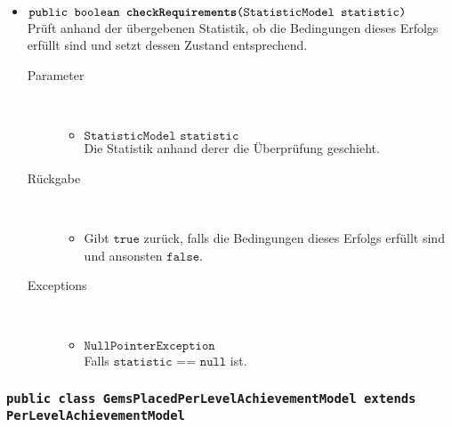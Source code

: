 \begin{description}
\begin{itemize}
		\item $\texttt{public boolean \textbf{checkRequirements}(StatisticModel statistic)}$ \\ Prüft anhand der übergebenen Statistik, ob die Bedingungen dieses Erfolgs erfüllt sind und setzt dessen Zustand entsprechend.
		\begin{description}
		\item[Parameter] \hfill \\
			\vspace{-.8cm}
			\begin{itemize}
				\item $\texttt{StatisticModel statistic}$ \\ Die Statistik anhand derer die Überprüfung geschieht. 
			\end{itemize}
			\item[Rückgabe] \hfill \\
			\vspace{-.8cm}
			\begin{itemize}
				\item Gibt $\texttt{true}$ zurück, falls die Bedingungen dieses Erfolgs erfüllt sind und ansonsten $\texttt{false}$.
			\end{itemize}
			\item[Exceptions] \hfill \\
			\vspace{-.8cm}
			\begin{itemize}
				\item $\texttt{NullPointerException}$ \\ Falls $\texttt{statistic == null}$ ist.
			\end{itemize}
		\end{description}
	\end{itemize}
\end{description}

\subsubsection{\normalfont \texttt{public class \textbf{GemsPlacedPerLevelAchievementModel} extends PerLevelAchievementModel}}


